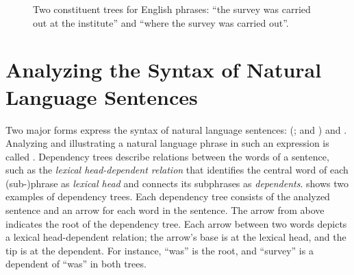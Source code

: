 \documentclass[../document.tex]{subfiles}
\begin{document}
    \begin{figure}
        \null\hfill
        
        \hfill
        
        \hfill\null
        \caption{\label{fig:constituent}
            Two constituent trees for English phrases: ``the survey was carried out at the institute'' and ``where the survey was carried out''.
        }
    \end{figure}

    \section*{Analyzing the Syntax of Natural Language Sentences}
    Two major forms express the syntax of natural language sentences:  (\citealp[Section~2.1]{Kue09}; and \citealp[Section~18.1]{Jur23}) and  \citep[Section~3]{Cho56}.
    Analyzing and illustrating a natural language phrase in such an expression is called .
    Dependency trees describe relations between the words of a sentence, such as the \emph{lexical head-dependent relation} that identifies the central word of each (sub-)phrase as \emph{lexical head} and connects its subphrases as \emph{dependents}.
     shows two examples of dependency trees.
    Each dependency tree consists of the analyzed sentence and an arrow for each word in the sentence.
    The arrow from above indicates the root of the dependency tree.
    Each arrow between two words depicts a lexical head-dependent relation; the arrow's base is at the lexical head, and the tip is at the dependent.
    For instance, ``was'' is the root, and ``survey'' is a dependent of ``was'' in both trees.
\end{document}
